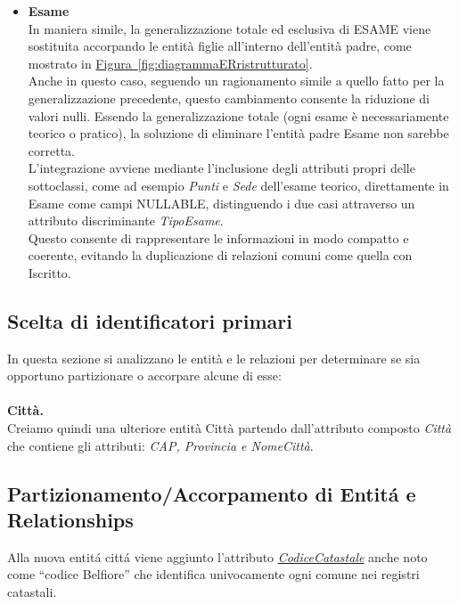\documentclass[10pt,twoside]{article}
\begin{document}
{{\begin{itemize}
            spostando in esse gli attributi specifici, ma ciò avrebbe comportato la duplicazione 
            delle relazioni comuni come Prenotazione e Recensione verso entrambe
            le sottoclassi.
            \item \textbf{Esame} \\In maniera simile, la generalizzazione totale ed esclusiva di ESAME viene sostituita 
            accorpando le entità figlie all’interno dell'entità padre, come mostrato in \hyperref[fig:diagrammaERristrutturato]{Figura~\ref*{fig:diagrammaERristrutturato}}. \\ 
            Anche in questo caso, seguendo un ragionamento simile a quello fatto per la 
            generalizzazione precedente, questo cambiamento consente la riduzione di valori nulli.
            Essendo la generalizzazione totale (ogni esame è necessariamente teorico o pratico), 
            la soluzione di eliminare l’entità padre Esame non sarebbe corretta. \\
            L'integrazione avviene mediante l'inclusione degli attributi propri delle sottoclassi,
            come ad esempio \textit{Punti} e \textit{Sede} dell'esame teorico, direttamente in Esame come campi 
            NULLABLE, distinguendo i due casi attraverso un attributo discriminante \textit{TipoEsame}. \\
            Questo consente di rappresentare le informazioni in modo compatto e coerente, 
            evitando la duplicazione di relazioni comuni come quella con Iscritto.
        \end{itemize}
    }

    \subsection{Scelta di identificatori primari}{
        In questa sezione si analizzano le entità e le relazioni per determinare se sia opportuno partizionare o accorpare alcune di esse:\\
        \\ \textbf{Città.} \\ 
        Creiamo quindi una ulteriore entità Città partendo dall'attributo composto \textit{Città} che contiene gli attributi: \textit{CAP, Provincia e NomeCittà}.
    }

    \subsection{Partizionamento/Accorpamento di Entitá e Relationships}{
        Alla nuova entitá cittá viene aggiunto l’attributo \href{https://www.agenziaentrate.gov.it/portale/documents/20143/448384/Tabella+codici+catastali+comuni_T4_codicicatastali_comuni_24_05_2019.pdf/d4fa70bd-f4bd-caba-24cb-5cc3611237c0}{\textit{CodiceCatastale}} anche noto come “codice
        Belfiore” che identifica univocamente ogni comune nei registri catastali.
    }

}
\end{document}
